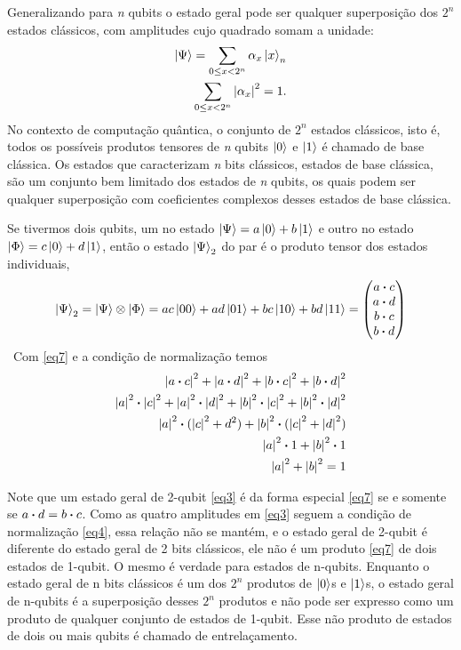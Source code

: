 \documentclass[a4paper, 12pt, oneside]{book}
\begin{document}
Generalizando para \textit{n} qubits o estado geral pode ser qualquer superposição dos $2^n$ estados clássicos, com amplitudes cujo quadrado somam a unidade:
\begin{align*}
\ket{\Psi} = \sum_{0\leq x<2^n} \alpha_x\ket{x}_n \\
\sum_{0\leq x<2^n} \abs{\alpha_x}^2 = 1.
\end{align*}
No contexto de computação quântica, o conjunto de $2^n$ estados clássicos, isto é, todos os possíveis produtos tensores de \textit{n} qubits $\ket{0}$ e $\ket{1}$ é chamado de base clássica. Os estados que caracterizam \textit{n} bits clássicos, estados de base clássica, são um conjunto bem limitado dos estados de \textit{n} qubits, os quais podem ser qualquer superposição com coeficientes complexos desses estados de base clássica.

Se tivermos dois qubits, um no estado $\ket{\Psi} = a\ket{0} + b\ket{1}$ e outro no estado $\ket{\Phi} = c\ket{0} + d\ket{1}$, então o estado $\ket{\Psi}_2$ do par é o produto tensor dos estados individuais,
\begin{equation}\label{eq7}
\ket{\Psi}_2 = \ket{\Psi}\otimes\ket{\Phi} 
= ac\ket{00} + ad\ket{01} + bc\ket{10} + bd\ket{11}
= \mqty(a \vdot c\\a \vdot d\\b \vdot c\\b \vdot d)
\end{equation}\
Com \eqref{eq7} e a condição de normalização temos
\begin{align*}
\abs{a \vdot c}^2 + \abs{a \vdot d}^2 + \abs{b \vdot c}^2 + \abs{b \vdot d}^2 \\
\abs{a}^2 \vdot \abs{c}^2 + \abs{a}^2 \vdot \abs{d}^2 + \abs{b}^2 \vdot \abs{c}^2 + \abs{b}^2 \vdot \abs{d}^2 \\
\abs{a}^2 \vdot (\abs{c}^2 + {d}^2) + \abs{b}^2 \vdot (\abs{c}^2 + \abs{d}^2) \\
\abs{a}^2 \vdot 1 + \abs{b}^2 \vdot 1 \\
\abs{a}^2 + \abs{b}^2 = 1
\end{align*}

Note que um estado geral de 2-qubit \eqref{eq3} é da forma especial \eqref{eq7} se e somente se $a\vdot d=b\vdot c$. Como as quatro amplitudes em \eqref{eq3} seguem a condição de normalização \eqref{eq4}, essa relação não se mantém, e o estado geral de 2-qubit é diferente do estado geral de 2 bits clássicos, ele não é um produto \eqref{eq7} de dois estados de 1-qubit. O mesmo é verdade para estados de n-qubits. Enquanto o estado geral de n bits clássicos é um dos $2^n$ produtos de $\ket{0}$s e $\ket{1}$s, o estado geral de n-qubits é a superposição desses $2^n$ produtos e não pode ser expresso como um produto de qualquer conjunto de estados de 1-qubit. Esse não produto de estados de dois ou mais qubits é chamado de entrelaçamento.
\end{document}

